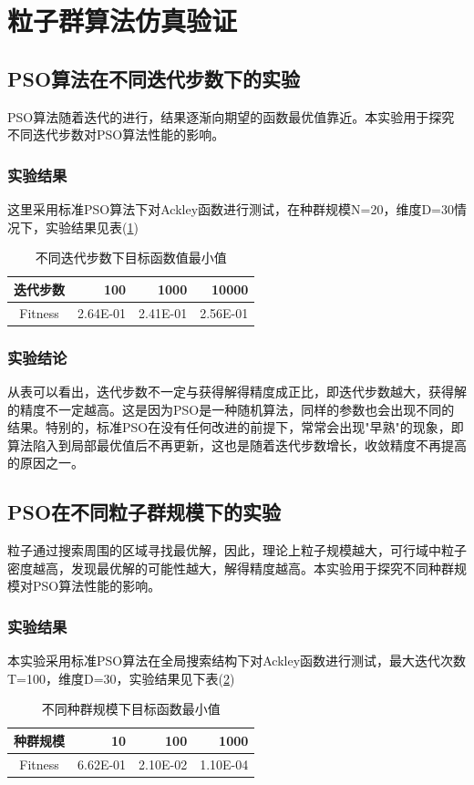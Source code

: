 \section{粒子群算法仿真验证}
\subsection{PSO算法在不同迭代步数下的实验}
PSO算法随着迭代的进行，结果逐渐向期望的函数最优值靠近。本实验用于探究不同迭代步数对PSO算法性能的影响。
\subsubsection{实验结果}
这里采用标准PSO算法下对Ackley函数进行测试，在种群规模N=20，维度D=30情况下，实验结果见表(\ref{tabmaxg})
\renewcommand\arraystretch{0.9}
\begin{table}[htbp]
	\centering
	\caption{不同迭代步数下目标函数值最小值}
	\label{tabmaxg}
	\begin{tabular}{crrr}
		\toprule[1.5pt]
		\textbf{迭代步数}  & \textbf{100}   & \textbf{1000}  & \textbf{10000} \\
		\midrule[1pt]
		Fitness & 2.64E-01 & 2.41E-01 & 2.56E-01 \\
		\bottomrule[1.5pt]
	\end{tabular}%
\end{table}%
\subsubsection{实验结论}
从表可以看出，迭代步数不一定与获得解得精度成正比，即迭代步数越大，获得解的精度不一定越高。这是因为PSO是一种随机算法，同样的参数也会出现不同的结果。特别的，标准PSO在没有任何改进的前提下，常常会出现"早熟"的现象，即算法陷入到局部最优值后不再更新，这也是随着迭代步数增长，收敛精度不再提高的原因之一。
\subsection{PSO在不同粒子群规模下的实验}
粒子通过搜索周围的区域寻找最优解，因此，理论上粒子规模越大，可行域中粒子密度越高，发现最优解的可能性越大，解得精度越高。本实验用于探究不同种群规模对PSO算法性能的影响。
\subsubsection{实验结果}
本实验采用标准PSO算法在全局搜索结构下对Ackley函数进行测试，最大迭代次数T=100，维度D=30，实验结果见下表(\ref{tabpopsize})
\renewcommand\arraystretch{0.9}
\begin{table}[htbp]
	\centering
	\caption{不同种群规模下目标函数最小值}
	\begin{tabular}{crrr}
		\toprule[1.5pt]
		\label{tabpopsize}
		\textbf{种群规模}  & \textbf{10}    & \textbf{100}   & \textbf{1000} \\
		\midrule[1pt]
		Fitness & 6.62E-01 & 2.10E-02 & 1.10E-04 \\
		\bottomrule[1.5pt]
	\end{tabular}%
\end{table}%
